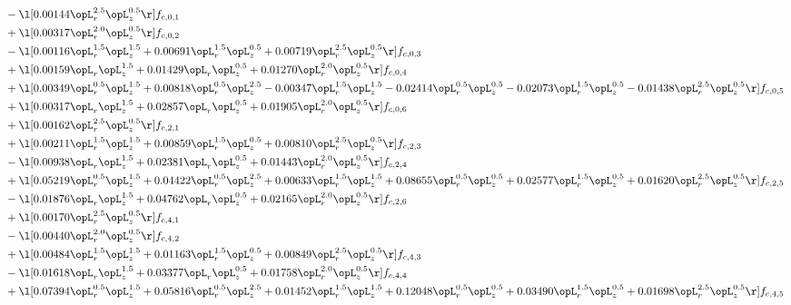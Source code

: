 \begin{alignat}{2}
& - \l[  0.00144 \opL_r^{2.5} \opL_z^{0.5}  \r] f_{c,0,1} \nonumber \\ 
& + \l[  0.00317 \opL_r^{2.0} \opL_z^{0.5}  \r] f_{c,0,2} \nonumber \\ 
& - \l[  0.00116 \opL_r^{1.5} \opL_z^{1.5} +  0.00691 \opL_r^{1.5} \opL_z^{0.5} +  0.00719 \opL_r^{2.5} \opL_z^{0.5}  \r] f_{c,0,3} \nonumber \\ 
& + \l[  0.00159 \opL_r \opL_z^{1.5} +  0.01429 \opL_r \opL_z^{0.5} +  0.01270 \opL_r^{2.0} \opL_z^{0.5}  \r] f_{c,0,4} \nonumber \\ 
& + \l[  0.00349 \opL_r^{0.5} \opL_z^{1.5} +  0.00818 \opL_r^{0.5} \opL_z^{2.5}   -0.00347 \opL_r^{1.5} \opL_z^{1.5}   -0.02414 \opL_r^{0.5} \opL_z^{0.5}   -0.02073 \opL_r^{1.5} \opL_z^{0.5}   -0.01438 \opL_r^{2.5} \opL_z^{0.5}  \r] f_{c,0,5} \nonumber \\ 
& + \l[  0.00317 \opL_r \opL_z^{1.5} +  0.02857 \opL_r \opL_z^{0.5} +  0.01905 \opL_r^{2.0} \opL_z^{0.5}  \r] f_{c,0,6} \nonumber \\ 
& + \l[  0.00162 \opL_r^{2.5} \opL_z^{0.5}  \r] f_{c,2,1} \nonumber \\ 
& + \l[  0.00211 \opL_r^{1.5} \opL_z^{1.5} +  0.00859 \opL_r^{1.5} \opL_z^{0.5} +  0.00810 \opL_r^{2.5} \opL_z^{0.5}  \r] f_{c,2,3} \nonumber \\ 
& - \l[  0.00938 \opL_r \opL_z^{1.5} +  0.02381 \opL_r \opL_z^{0.5} +  0.01443 \opL_r^{2.0} \opL_z^{0.5}  \r] f_{c,2,4} \nonumber \\ 
& + \l[  0.05219 \opL_r^{0.5} \opL_z^{1.5} +  0.04422 \opL_r^{0.5} \opL_z^{2.5} +  0.00633 \opL_r^{1.5} \opL_z^{1.5} +  0.08655 \opL_r^{0.5} \opL_z^{0.5} +  0.02577 \opL_r^{1.5} \opL_z^{0.5} +  0.01620 \opL_r^{2.5} \opL_z^{0.5}  \r] f_{c,2,5} \nonumber \\ 
& - \l[  0.01876 \opL_r \opL_z^{1.5} +  0.04762 \opL_r \opL_z^{0.5} +  0.02165 \opL_r^{2.0} \opL_z^{0.5}  \r] f_{c,2,6} \nonumber \\ 
& + \l[  0.00170 \opL_r^{2.5} \opL_z^{0.5}  \r] f_{c,4,1} \nonumber \\ 
& - \l[  0.00440 \opL_r^{2.0} \opL_z^{0.5}  \r] f_{c,4,2} \nonumber \\ 
& + \l[  0.00484 \opL_r^{1.5} \opL_z^{1.5} +  0.01163 \opL_r^{1.5} \opL_z^{0.5} +  0.00849 \opL_r^{2.5} \opL_z^{0.5}  \r] f_{c,4,3} \nonumber \\ 
& - \l[  0.01618 \opL_r \opL_z^{1.5} +  0.03377 \opL_r \opL_z^{0.5} +  0.01758 \opL_r^{2.0} \opL_z^{0.5}  \r] f_{c,4,4} \nonumber \\ 
& + \l[  0.07394 \opL_r^{0.5} \opL_z^{1.5} +  0.05816 \opL_r^{0.5} \opL_z^{2.5} +  0.01452 \opL_r^{1.5} \opL_z^{1.5} +  0.12048 \opL_r^{0.5} \opL_z^{0.5} +  0.03490 \opL_r^{1.5} \opL_z^{0.5} +  0.01698 \opL_r^{2.5} \opL_z^{0.5}  \r] f_{c,4,5} \nonumber \\ 

\end{alignat}

